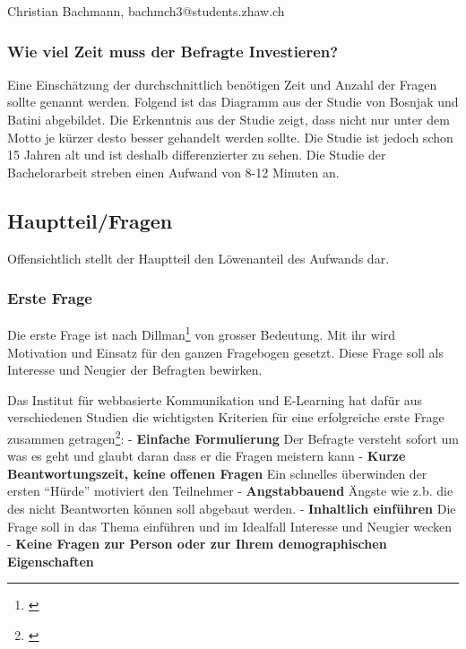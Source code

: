 Christian Bachmann, bachmch3@students.zhaw.ch

\subsubsection{Wie viel Zeit muss der Befragte
Investieren?}\label{wie-viel-zeit-muss-der-befragte-investieren}

Eine Einschätzung der durchschnittlich benötigen Zeit und Anzahl der
Fragen sollte genannt werden. Folgend ist das Diagramm aus der Studie
von Bosnjak und Batini abgebildet. Die Erkenntnis aus der Studie zeigt,
dass nicht nur unter dem Motto je kürzer desto besser gehandelt werden
sollte. Die Studie ist jedoch schon 15 Jahren alt und ist deshalb
differenzierter zu sehen. Die Studie der Bachelorarbeit streben einen
Aufwand von 8-12 Minuten an.

\newpage

\subsection{Hauptteil/Fragen}\label{hauptteilfragen}

Offensichtlich stellt der Hauptteil den Löwenanteil des Aufwands dar.

\subsubsection{Erste Frage}\label{erste-frage}

Die erste Frage ist nach Dillman\footnote{\autocite{dillman}} von
grosser Bedeutung. Mit ihr wird Motivation und Einsatz für den ganzen
Fragebogen gesetzt. Diese Frage soll als Interesse und Neugier der
Befragten bewirken.

Das Institut für webbasierte Kommunikation und E-Learning hat dafür aus
verschiedenen Studien die wichtigsten Kriterien für eine erfolgreiche
erste Frage zusammen getragen\footnote{\autocite{fragebogen}}: -
\textbf{Einfache Formulierung} Der Befragte versteht sofort um was es
geht und glaubt daran dass er die Fragen meistern kann - \textbf{Kurze
Beantwortungszeit, keine offenen Fragen} Ein schnelles überwinden der
ersten ``Hürde'' motiviert den Teilnehmer - \textbf{Angstabbauend}
Ängste wie z.b. die des nicht Beantworten können soll abgebaut werden. -
\textbf{Inhaltlich einführen} Die Frage soll in das Thema einführen und
im Idealfall Interesse und Neugier wecken - \textbf{Keine Fragen zur
Person oder zur Ihrem demographischen Eigenschaften}

